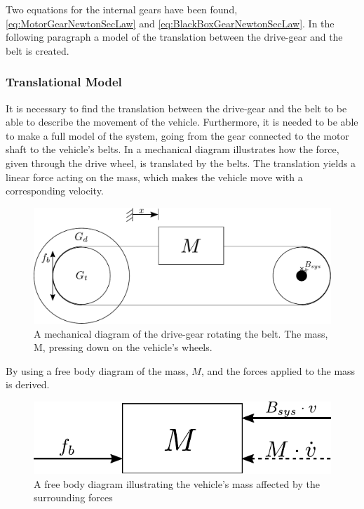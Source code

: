 Two equations for the internal gears have been found, \eqref{eq:MotorGearNewtonSecLaw} and \eqref{eq:BlackBoxGearNewtonSecLaw}. In the following paragraph a model of the translation between the drive-gear and the belt is created.

\subsubsection{Translational Model}\label{BeltModel}
It is necessary to find the translation between the drive-gear and the belt to be able to describe the movement of the vehicle. Furthermore, it is needed to be able to make a full model of the system, going from the gear connected to the motor shaft to the vehicle's belts. In  a mechanical diagram illustrates how the force, given through the drive wheel, is translated by the belts. The translation yields a linear force acting on the mass, which makes the vehicle move with a corresponding velocity.

\begin{figure}[H]
	\centering
	\includegraphics[scale=0.8]{figures/mechanicalDrawingBelt.pdf}
	\caption{A mechanical diagram of the drive-gear rotating the belt. The mass, M, pressing down on the vehicle's wheels.}
	\label{fig:BeltMechanicalDiagram}
\end{figure}

By using  a free body diagram of the mass, $M$, and the forces applied to the mass is derived.

\begin{figure}[H]
	\centering
	\includegraphics[scale=.8]{figures/freeBodyBelt.pdf}
	\caption{A free body diagram illustrating the vehicle's mass affected by the surrounding forces}
	\label{fig:BeltFreeBodyDiagram}
\end{figure}

